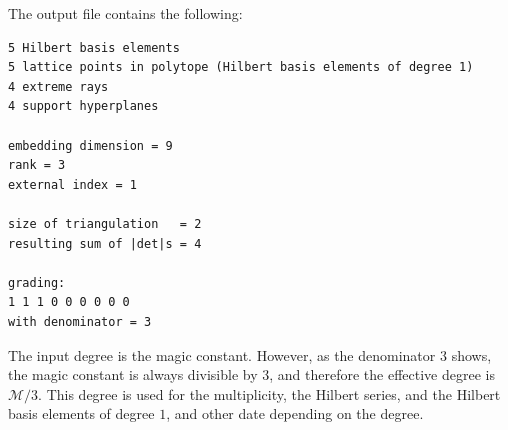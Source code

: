 The output file contains the following:

\begin{Verbatim}
5 Hilbert basis elements
5 lattice points in polytope (Hilbert basis elements of degree 1)
4 extreme rays
4 support hyperplanes

embedding dimension = 9
rank = 3
external index = 1

size of triangulation   = 2
resulting sum of |det|s = 4

grading:
1 1 1 0 0 0 0 0 0 
with denominator = 3
\end{Verbatim}
The input degree is the magic constant. However, as the
denominator $3$ shows, the magic constant is always divisible
by $3$, and therefore the effective degree is $\mathcal M/3$.
This degree is used for the multiplicity, the Hilbert series, and the
Hilbert basis elements of degree $1$, and other date depending on the degree.

